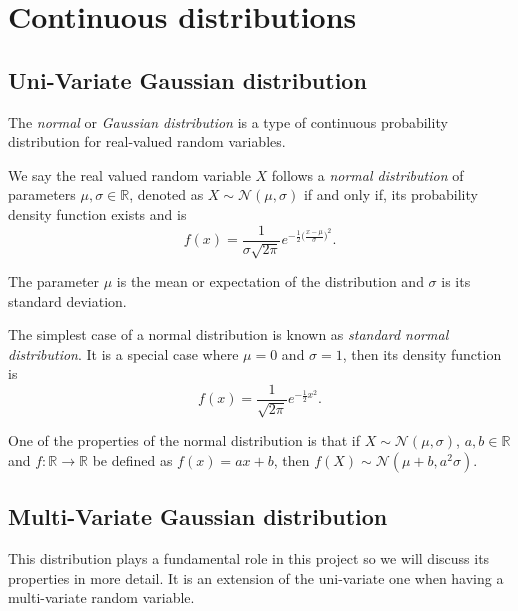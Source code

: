 \section{Continuous distributions}

\subsection*{Uni-Variate Gaussian distribution}

The \emph{normal} or \emph{Gaussian distribution} is a type of continuous
probability distribution for real-valued random variables.

\begin{definition}
  We say the real valued random variable \(X\) follows a \emph{normal distribution} of
  parameters \(\mu, \sigma \in \mathbb{R}\), denoted as \(X \sim \mathcal{N}(\mu,
  \sigma)\) if and only if, its probability density function exists and is
  \[
    f(x) = \frac{1}{\sigma \sqrt{2\pi}} e^{-\frac{1}{2}\big(\frac{x-\mu}{\sigma} \big)^2}.
  \]

  The parameter \(\mu\) is the mean or expectation of the distribution and
  \(\sigma\) is its standard deviation.

\end{definition}

The simplest case of a normal distribution is known as \emph{standard normal
  distribution}. It is a special case where \(\mu = 0\) and \(\sigma = 1\), then
its density function is
\[
  f(x) = \frac{1}{\sqrt{2\pi}}e^{-\frac{1}{2}x^2}.
\]

One of the properties of the normal distribution is that if \(X \sim \mathcal{N}(\mu, \sigma)\), \(a,b \in \mathbb{R}\) and \(f:\mathbb{R} \to \mathbb{R}\) be defined
as \(f(x) = ax + b\), then \(f(X) \sim \mathcal{N}(\mu + b, a^2 \sigma)\).

\subsection*{Multi-Variate Gaussian distribution}

This distribution plays a fundamental role in this project so we will discuss
its properties in more detail. It is an extension of the uni-variate one when having a
multi-variate random variable.

